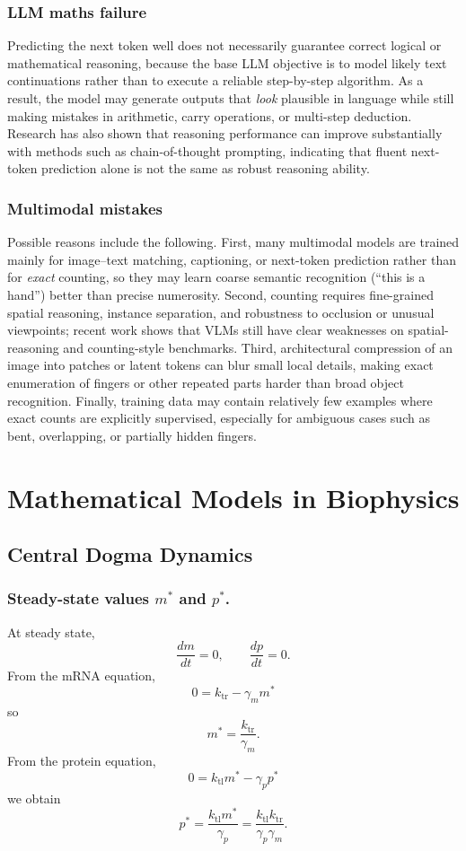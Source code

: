\documentclass[12pt,a4paper]{article}
\begin{document}
\subsubsection{LLM maths failure}
Predicting the next token well does not necessarily guarantee correct logical or mathematical reasoning, because the base LLM objective is to model likely text continuations rather than to execute a reliable step-by-step algorithm. As a result, the model may generate outputs that \emph{look} plausible in language while still making mistakes in arithmetic, carry operations, or multi-step deduction. Research has also shown that reasoning performance can improve substantially with methods such as chain-of-thought prompting, indicating that fluent next-token prediction alone is not the same as robust reasoning ability.

\subsubsection{Multimodal mistakes}
Possible reasons include the following. First, many multimodal models are trained mainly for image--text matching, captioning, or next-token prediction rather than for \emph{exact} counting, so they may learn coarse semantic recognition (``this is a hand'') better than precise numerosity. Second, counting requires fine-grained spatial reasoning, instance separation, and robustness to occlusion or unusual viewpoints; recent work shows that VLMs still have clear weaknesses on spatial-reasoning and counting-style benchmarks. Third, architectural compression of an image into patches or latent tokens can blur small local details, making exact enumeration of fingers or other repeated parts harder than broad object recognition. Finally, training data may contain relatively few examples where exact counts are explicitly supervised, especially for ambiguous cases such as bent, overlapping, or partially hidden fingers.



\section{Mathematical Models in Biophysics}
\subsection{Central Dogma Dynamics}

\subsubsection{Steady-state values \texorpdfstring{$m^*$ and $p^*$}{m* and p*}.}
At steady state,
\[
  \frac{dm}{dt}=0,\qquad \frac{dp}{dt}=0.
\]
From the mRNA equation,
\[
  0=k_{\mathrm{tr}}-\gamma_m m^*
\]
so
\[
  m^*=\frac{k_{\mathrm{tr}}}{\gamma_m}.
\]
From the protein equation,
\[
  0=k_{\mathrm{tl}}m^*-\gamma_p p^*
\]
we obtain
\[
  p^*=\frac{k_{\mathrm{tl}}m^*}{\gamma_p}=\frac{k_{\mathrm{tl}}k_{\mathrm{tr}}}{\gamma_p\gamma_m}.
\]
\end{document}

